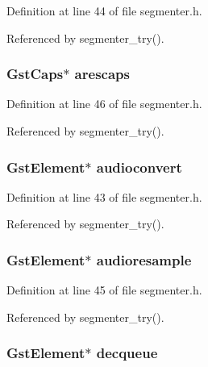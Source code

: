 \-Definition at line 44 of file segmenter.\-h.



\-Referenced by segmenter\-\_\-try().

\hypertarget{struct_audio_bag_a740ee81301820a0ab68d91c9f96a9f75}{
\subsubsection[{arescaps}]{\setlength{\rightskip}{0pt plus 5cm}\-Gst\-Caps$\ast$ {\bf arescaps}}}\label{struct_audio_bag_a740ee81301820a0ab68d91c9f96a9f75}


\-Definition at line 46 of file segmenter.\-h.



\-Referenced by segmenter\-\_\-try().

\hypertarget{struct_audio_bag_a5c648b7312b292946b43b94d35c5aeef}{
\subsubsection[{audioconvert}]{\setlength{\rightskip}{0pt plus 5cm}\-Gst\-Element$\ast$ {\bf audioconvert}}}\label{struct_audio_bag_a5c648b7312b292946b43b94d35c5aeef}


\-Definition at line 43 of file segmenter.\-h.



\-Referenced by segmenter\-\_\-try().

\hypertarget{struct_audio_bag_ab3ae963e4ecb268062c0408e1046603f}{
\subsubsection[{audioresample}]{\setlength{\rightskip}{0pt plus 5cm}\-Gst\-Element$\ast$ {\bf audioresample}}}\label{struct_audio_bag_ab3ae963e4ecb268062c0408e1046603f}


\-Definition at line 45 of file segmenter.\-h.



\-Referenced by segmenter\-\_\-try().

\hypertarget{struct_audio_bag_a60c8bc4118567d2ebc6ae53bca576f93}{
\subsubsection[{decqueue}]{\setlength{\rightskip}{0pt plus 5cm}\-Gst\-Element$\ast$ {\bf decqueue}}}\label{struct_audio_bag_a60c8bc4118567d2ebc6ae53bca576f93}


